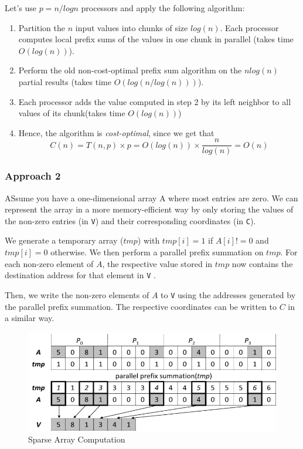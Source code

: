Let's use $p = n/logn$ processors and apply the following algorithm:
\begin{enumerate}
   \item Partition the $n$ input values into chunks of size $log(n)$. Each processor computes local prefix sums of the values in one chunk in parallel (takes time $O(log(n))$).
   \item Perform the old non-cost-optimal prefix sum algorithm on the $n log(n)$ partial results (takes time $O(log(n/ log(n)))$).
   \item Each processor adds the value computed in step 2 by its left neighbor to all values of its chunk(takes time $O(log(n))$)
   \item[] Hence, the algorithm is \textit{cost-optimal}, since we get that
   \begin{equation}
      C(n) = T(n,p)\times p = O(log(n))\times \frac{n}{log(n)} = O(n)
   \end{equation}
 \end{enumerate}

\subsubsection{Approach 2}

ASsume you have a one-dimensional array A where most entries are zero.
We can represent the array in a more memory-efficient way by only storing the values of the non-zero entries (in \texttt{V}) and their corresponding coordinates (in \texttt{C}).

\begin{paracol}{2}
   
   
   We generate a temporary array ($tmp$) with $tmp[i] = 1$ if $A[i] != 0$ and $tmp[i] = 0$ otherwise. We then perform a parallel prefix summation on $tmp$. For each non-zero element of $A$, the respective value stored in $tmp$ now contains the destination address for that element in \texttt{V} .
   
   Then, we write the non-zero elements of $A$ to \texttt{V} using the addresses generated by the parallel prefix summation.
   The respective coordinates can be written to $C$ in a similar way.
   
   \switchcolumn

   \begin{figure}[htbp]
      \centering
      \includegraphics{images/07/sparsearray.png}
      \caption{Sparse Array Computation}
      \label{fig:07/sparsearray}
   \end{figure}

\end{paracol}

